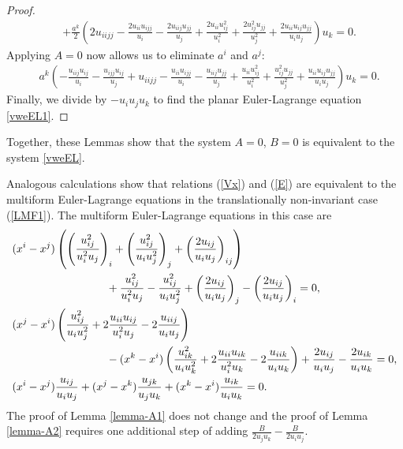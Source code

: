 \documentclass[12pt, a4paper]{article}
\theoremstyle{definition}
\begin{document}
\begin{proof}
\begin{align*}
		&+ \frac{a^{k}}{2} {\left( 2 {u_{iijj}} - \frac{2 {u_{ii}} {u_{ijj}} }{{u_{i}}} - \frac{2 {u_{iij}} {u_{jj}} }{{u_{j}}} + \frac{2 {u_{ii}} u_{ij}^2 }{u_{i}^2} + \frac{2 u_{ij}^2 {u_{jj}} }{u_{j}^2} + \frac{2 {u_{ii}} {u_{ij}} {u_{jj}}}{{u_{i}} {u_{j}}} \right)} u_k = 0 .
	\end{align*}
	Applying $A = 0$ now allows us to eliminate $a^i$ and $a^j$:
	\begin{align*}
		& a^{k} \left( - \frac{{u_{iij}} u_{ij}}{{u_{i}}} - \frac{{u_{ijj}} u_{ij}}{{u_{j}}} \mathrel{+}  {u_{iijj}} - \frac{{u_{ii}} {u_{ijj}} }{{u_{i}}} - \frac{ {u_{iij}} {u_{jj}} }{{u_{j}}} + \frac{{u_{ii}} u_{ij}^2 }{u_{i}^2} + \frac{u_{ij}^2 {u_{jj}} }{u_{j}^2} + \frac{{u_{ii}} {u_{ij}} {u_{jj}}}{{u_{i}} {u_{j}}} \right) u_k = 0 .
	\end{align*}
	Finally, we divide by $-u_i u_j u_k$ to find the planar Euler-Lagrange equation \eqref{vweEL1}.
\end{proof}

Together, these Lemmas show that the system $A=0$, $B = 0$ is equivalent to  the system \eqref{vweEL}.

Analogous calculations show that relations (\ref{Vx}) and (\ref{E}) are equivalent to the multiform Euler-Lagrange equations in the translationally non-invariant case (\ref{LMF1}). The multiform Euler-Lagrange equations in this case are 
\begin{subequations} 
	\label{vweEL-nonautonomous}
	\begin{align}
		&(x^i-x^j) \left( \left(\frac{u_{ij}^2}{u_i^2u_j}\right)_i + \left(\frac{u_{ij}^2}{u_iu_j^2}\right)_j + \left(\frac{2u_{ij}}{u_iu_j}\right)_{ij} \right) \notag\\
		&\hspace{3cm} + \frac{u_{ij}^2}{u_i^2u_j} - \frac{u_{ij}^2}{u_iu_j^2} + \left(\frac{2u_{ij}}{u_iu_j}\right)_{j} - \left(\frac{2u_{ij}}{u_iu_j}\right)_{i} = 0, \\
		&(x^j - x^i) \left( \frac{u_{ij}^2}{u_i u_j^2} + 2 \frac{u_{ii}u_{ij}}{u_i^2 u_j} - 2 \frac{u_{iij}}{u_i u_j}\right) \notag\\
		&\hspace{3cm} - (x^k - x^i) \left( \frac{u_{ik}^2}{u_i u_k^2} + 2 \frac{u_{ii}u_{ik}}{u_i^2 u_k} - 2 \frac{u_{iik}}{u_i u_k}\right) + \frac{2u_{ij}}{u_i u_j} - \frac{2u_{ik}}{u_i u_k} = 0,  
		\\
		& (x^i-x^j)\frac{u_{ij}}{u_iu_j}+(x^j-x^k)\frac{u_{jk}}{u_ju_k}+(x^k-x^i)\frac{u_{ik}}{u_iu_k} = 0 . 
	\end{align}
\end{subequations}
The proof of Lemma \ref{lemma-A1} does not change and the proof of Lemma \ref{lemma-A2} requires one additional step of adding $\frac{B}{2 u_j u_k} - \frac{B}{2 u_i u_j}$.
\end{document}

